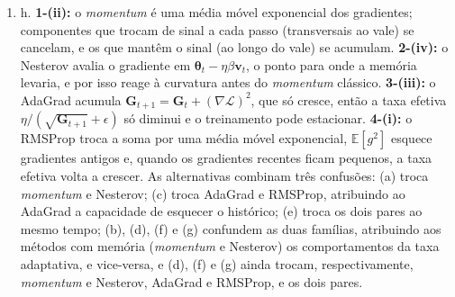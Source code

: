 \documentclass{dlproblemset}
\begin{document}
\begin{enumerate}[1)]
    \item h. \textbf{1-(ii):} o \textit{momentum} é uma média móvel exponencial dos gradientes; componentes que trocam de sinal a cada passo (transversais ao vale) se cancelam, e os que mantêm o sinal (ao longo do vale) se acumulam. \textbf{2-(iv):} o Nesterov avalia o gradiente em $\boldsymbol{\theta}_t - \eta\beta\mathbf{v}_t$, o ponto para onde a memória levaria, e por isso reage à curvatura antes do \textit{momentum} clássico. \textbf{3-(iii):} o AdaGrad acumula $\mathbf{G}_{t+1} = \mathbf{G}_t + (\nabla\mathcal{L})^2$, que só cresce, então a taxa efetiva $\eta/(\sqrt{\mathbf{G}_{t+1}} + \epsilon)$ só diminui e o treinamento pode estacionar. \textbf{4-(i):} o RMSProp troca a soma por uma média móvel exponencial, $\mathbb{E}[g^2]$ esquece gradientes antigos e, quando os gradientes recentes ficam pequenos, a taxa efetiva volta a crescer. As alternativas combinam três confusões: (a) troca \textit{momentum} e Nesterov; (c) troca AdaGrad e RMSProp, atribuindo ao AdaGrad a capacidade de esquecer o histórico; (e) troca os dois pares ao mesmo tempo; (b), (d), (f) e (g) confundem as duas famílias, atribuindo aos métodos com memória (\textit{momentum} e Nesterov) os comportamentos da taxa adaptativa, e vice-versa, e (d), (f) e (g) ainda trocam, respectivamente, \textit{momentum} e Nesterov, AdaGrad e RMSProp, e os dois pares.


\end{enumerate}
\end{document}
